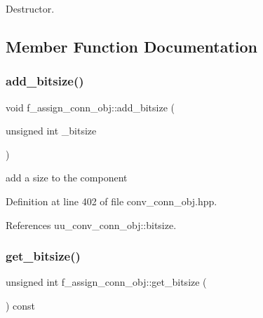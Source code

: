 Destructor. 



\subsection{Member Function Documentation}
\mbox{\label{classf__assign__conn__obj_a6e8e1b379e465cf509560b0101a55d7d}} 
\subsubsection{\texorpdfstring{add\+\_\+bitsize()}{add\_bitsize()}}
{\footnotesize\ttfamily void f\+\_\+assign\+\_\+conn\+\_\+obj\+::add\+\_\+bitsize (\begin{DoxyParamCaption}\item[{unsigned int}]{\+\_\+bitsize }\end{DoxyParamCaption})\hspace{0.3cm}{\ttfamily [inline]}}



add a size to the component 



Definition at line 402 of file conv\+\_\+conn\+\_\+obj.\+hpp.



References uu\+\_\+conv\+\_\+conn\+\_\+obj\+::bitsize.

\mbox{\label{classf__assign__conn__obj_a166bc7d1dbabee02c498a9ae3d5d85df}} 
\subsubsection{\texorpdfstring{get\+\_\+bitsize()}{get\_bitsize()}}
{\footnotesize\ttfamily unsigned int f\+\_\+assign\+\_\+conn\+\_\+obj\+::get\+\_\+bitsize (\begin{DoxyParamCaption}{ }\end{DoxyParamCaption}) const\hspace{0.3cm}{\ttfamily [inline]}}



